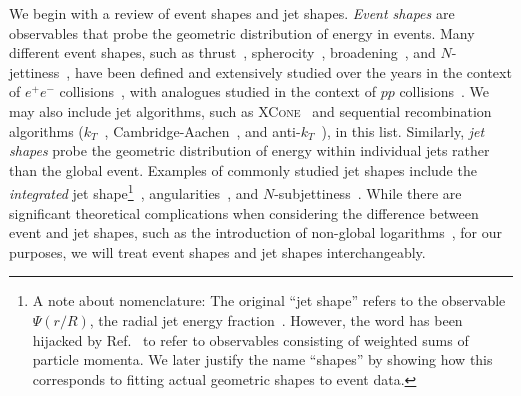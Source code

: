 \documentclass[letterpaper,11pt]{article}
\DeclareRobustCommand{\Refer}[1]{Ref.~\cite{#1}}
\begin{document}
We begin with a review of event shapes and jet shapes. \emph{Event shapes} are observables that probe the geometric distribution of energy in events. Many different event shapes, such as thrust~\cite{BRANDT196457, PhysRevLett.39.1587, DERUJULA1978387}, spherocity~\cite{Georgi:1977sf}, broadening~\cite{Larkoski:2014uqa}, and $N$-jettiness~\cite{Stewart:2010tn, Stewart:2015waa}, have been defined and extensively studied over the years in the context of $e^+e^-$ collisions~\cite{Dasgupta:2003iq}, with analogues studied in the context of $pp$ collisions~\cite{Banfi_2004, Banfi:2010xy}.
%
We may also include jet algorithms, such as \textsc{XCone}~\cite{Stewart:2015waa} and sequential recombination algorithms ($k_T$~\cite{Catani:1993hr, Ellis:1993tq}, Cambridge-Aachen~\cite{Dokshitzer:1997in, Wobisch:1998wt}, and anti-$k_T$~\cite{Cacciari:2008gp}), in this list.
%
Similarly, \emph{jet shapes} probe the geometric distribution of energy within individual jets rather than the global event.
%
Examples of commonly studied jet shapes include the \textit{integrated} jet shape\footnote{A note about nomenclature: The original ``jet shape'' refers to the observable $\Psi(r/R)$, the radial jet energy fraction~\cite{Ellis:1992qq, PhysRevLett.70.713}. However, the word has been hijacked by \Refer{Ellis_2010} to refer to observables consisting of weighted sums of particle momenta. We later justify the name ``shapes'' by showing how this corresponds to fitting actual geometric shapes to event data.}~\cite{Ellis:1992qq, PhysRevLett.70.713}, angularities~\cite{ Berger:2003iw, Berger:2004xf}, and $N$-subjettiness~\cite{Thaler:2010tr}. While there are significant theoretical complications when considering the difference between event and jet shapes, such as the introduction of non-global logarithms~\cite{Dasgupta:2001sh, Banfi:2010pa}, for our purposes, we will treat event shapes and jet shapes interchangeably. 
\end{document}
